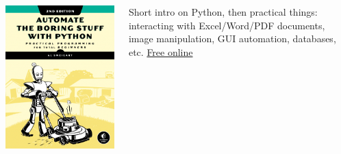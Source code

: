 \documentclass[xcolor=table,aspectratio=169]{beamer}
\begin{document}
{\begin{columns}
    \begin{minipage}[c][0.6\textheight][c]{\linewidth}
        \centering
        \includegraphics[width=0.8\linewidth]{automate_2e_cover.png}
    \end{minipage}
    \begin{minipage}[c][0.2\textheight][c]{\linewidth}
        \footnotesize{Short intro on Python, then practical things: interacting with Excel/Word/PDF documents, image manipulation, GUI automation, databases, etc. \href{https://automatetheboringstuff.com/2e/chapter0/}{Free online}} 
    \end{minipage}


\end{columns}}
\end{document}
